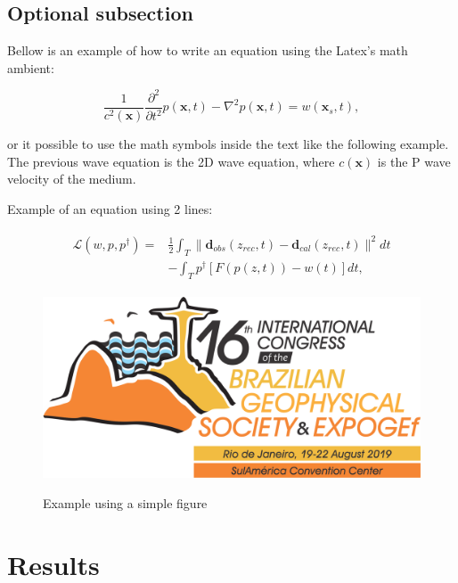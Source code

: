 \documentclass[twoside,letterpaper,twocolumn]{article}
\begin{document}
\subsection{Optional subsection}

Bellow is an example of how to write an equation using the Latex's math ambient:

\begin{equation}\label{waveequation}
\frac{ 1}{  c^2(\mathbf{x})}\frac{\partial^2}{\partial t^2}p(\mathbf{x},t) - \nabla^2 p(\mathbf{x},t)  = w(\mathbf{x}_s,t),				
\end{equation}

\noindent
or it possible to use the math symbols inside the text like the following example. The previous wave equation is the 2D wave equation, where $ c(\mathbf{x}) $ is the P wave velocity of the medium. 

Example of an equation using 2 lines:

\begin{eqnarray}\label{unconstrainedLagrangian}
 \begin{array}{rl}
\mathcal{L}(w,p,p^{\dagger}) = &\displaystyle \frac{1}{2}\int_{T} \| \mathbf{d}_{obs}(z_{rec},t) - \mathbf{d}_{cal}(z_{rec},t) \|^2 dt \\
                               &\displaystyle - \int_{T}p^{\dagger}\left[ F\left(p(z,t)\right) - w(t) \right] dt ,
\end{array}   
\end{eqnarray}



\begin{figure}[h!]
	\centering
	\includegraphics[width=0.9\linewidth]{images/logo_congress}
	\label{fig:label4}	
	\caption{Example using a simple figure}
\end{figure}


\section{Results}
\end{document}
